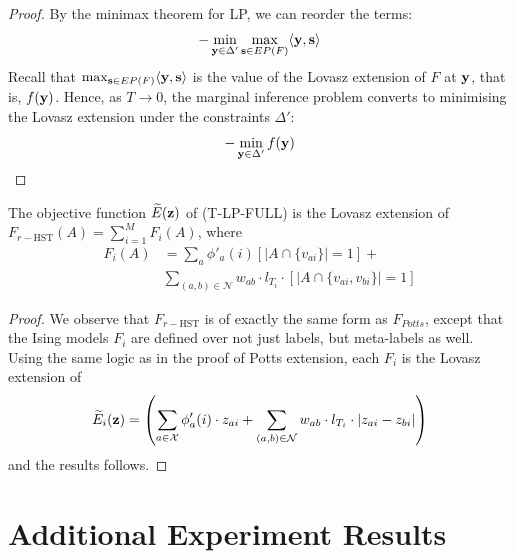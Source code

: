{{{\begin{proof}
By the minimax theorem for LP, we can reorder the terms:
\begin{equation}
    - \min_{{\bf y} \in \Delta'} \max_{{\bf s} \in EP(F)} \langle {\bf y}, {\bf s} \rangle 
\end{equation}
Recall that $\max_{{\bf s} \in EP(F)} \langle {\bf y}, {\bf s} \rangle$ is the value of the Lovasz extension of $F$ at $\bf y$, that is, $f({\bf y})$. Hence, as $T \to 0$, the marginal inference problem converts to minimising the Lovasz extension under the constraints $\Delta'$:
\begin{equation}
    - \min_{{\bf y} \in \Delta'} f({\bf y}) 
\end{equation}
\end{proof}

{\proposition The objective function $\widetilde{E}({\bf z})$ of (T-LP-FULL) is the Lovasz extension of $F_{r-\textrm{HST}}(A) = \sum_{i = 1}^M F_i(A)$, where
\begin{align}
    F_i(A) &= \sum_a \phi'_{a}(i) [|A \cap \{v_{ai}\}| = 1] + \nonumber \\
           &\sum_{(a, b) \in {\mathcal N}} {w_{ab}} \cdot l_{T_i} \cdot [|A \cap \{v_{ai}, v_{bi}\}| = 1]
\end{align}
\begin{proof}
    We observe that $F_{r-\textrm{HST}}$ is of exactly the same form as
    $F_{Potts}$, except that the Ising models $F_i$ are defined over not just labels, but meta-labels as well. Using the same logic as in the proof of Potts extension, each $F_i$ is the Lovasz extension of 
        \begin{equation}
            \widetilde{E}_i({\bf z}) = \left( \sum_{a \in {\mathcal X}} \phi_a'(i) \cdot z_{ai} + \sum_{(a, b) \in {\mathcal N}} w_{ab} \cdot l_{T_i} \cdot |z_{ai} - z_{bi}| \right)
        \end{equation}
    and the results follows. 
\end{proof}
\iffalse
\section{Additional Experiment Results}

}}}}
